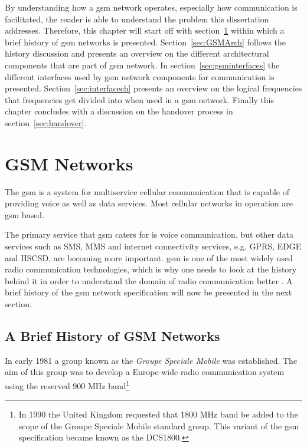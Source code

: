 By understanding how a \gls{gsm} network operates, especially how communication is facilitated, the reader is able to understand the problem this dissertation addresses. Therefore, this chapter will start off with section~\ref{sec:GSMNet} within which a brief history of \gls{gsm} networks is presented. Section~\ref{sec:GSMArch} follows the history discussion and presents an overview on the different architectural components that are part of \gls{gsm} network. In section~\ref{sec:gsminterfaces} the different interfaces used by \gls{gsm} network components for communication is presented. Section~\ref{sec:interfacech} presents an overview on the logical frequencies that frequencies get divided into when used in a \gls{gsm} network. Finally this chapter concludes with a discussion on the handover process in section~\ref{sec:handover}.

\section{GSM Networks}
\label{sec:GSMNet}
The \gls{gsm} is a system for multiservice cellular communication that is capable of providing voice as well as data services\cite{GSMArchitectureProtocolsServices,wirelesstelcoMullet}. Most cellular networks in operation are \gls{gsm} based\cite{Karen2004,wirelesstelcoMullet}. 

The primary service that \gls{gsm} caters for is voice communication, but other data services such as \gls{SMS}, \gls{MMS} and internet connectivity services, e.g. \gls{GPRS}, \gls{EDGE} and \gls{HSCSD}, are becoming more important\cite{GSMArchitectureProtocolsServices,Eisenblatter}.
\Gls{gsm} is one of the most widely used radio communication technologies, which is why one needs to look at the history behind it in order to understand the domain of radio communication better \cite{GSMArchitectureProtocolsServices}. A brief history of the \gls{gsm} network specification will now be presented in the next section.

\subsection{A Brief History of GSM Networks}
\label{sec:gsmhistory}
In early 1981 a group known as the \emph{Groupe Speciale Mobile} was established. The aim of this group was to develop a Europe-wide radio communication system using the reserved 900 MHz band\footnote{In 1990 the United Kingdom requested that 1800 MHz band be added to the scope of the Groupe Speciale Mobile standard group. This variant of the \gls{gsm} specification became known as the \gls{DCS1800}\cite{GSM92,Karen2004}.}

